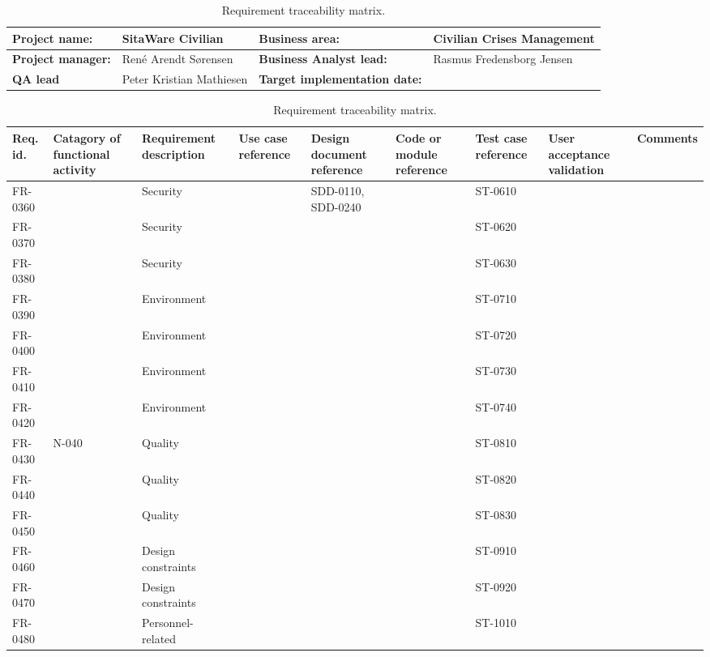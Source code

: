 \begin{sidewaystable}
\begin{table}[H]
\begin{tabular}{|l|l|l|l|}
\hline
 \textbf{Project name:} & SitaWare Civilian & \textbf{Business area:}  & Civilian Crises Management\\ \hline
 \textbf{Project manager:} & René Arendt Sørensen & \textbf{Business Analyst lead:} & Rasmus Fredensborg  Jensen\\ \hline
 \textbf{QA lead} & Peter Kristian Mathiesen & \textbf{Target implementation date:}  & \\ \hline
\end{tabular}	
\begin{tabular}{|p{2cm}|p{2cm}|p{3cm}|p{2cm}|p{2cm}|p{2cm}|p{2cm}|p{2cm}|p{2cm}|}
\hline
 Req. id. & Catagory of functional activity & Requirement description  & Use case reference & Design document reference & Code or module reference & Test case reference & User acceptance validation & Comments\\ \hline
  FR-0360 & & Security & &SDD-0110, SDD-0240 & & ST-0610 & &\\ \hline
 FR-0370 & & Security & && & ST-0620 & &\\ \hline   	
 FR-0380 & & Security & && & ST-0630 & &\\ \hline
 FR-0390 & & Environment & && &ST-0710 & &\\ \hline
 FR-0400 & & Environment & && &ST-0720 & &\\ \hline
 FR-0410 & & Environment & && &ST-0730 & &\\ \hline
 FR-0420 & & Environment & && &ST-0740 & &\\ \hline
 FR-0430 & N-040 & Quality & && &ST-0810 & &\\ \hline
 FR-0440 & & Quality & && &ST-0820 & &\\ \hline
 FR-0450 & & Quality & && &ST-0830 & &\\ \hline
 FR-0460 & & Design constraints & && &ST-0910 & &\\ \hline
 FR-0470 & & Design constraints & && &ST-0920 & &\\ \hline
 FR-0480 & & Personnel-related & && &ST-1010 & &\\ \hline 
\end{tabular}	
\caption{Requirement traceability matrix.}
\end{table}

\end{sidewaystable}



